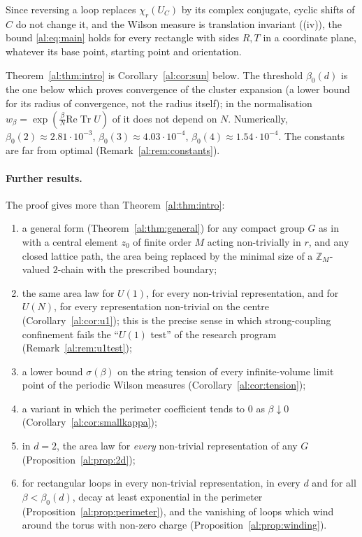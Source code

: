 \documentclass[11pt,a4paper]{article}
\theoremstyle{definition}
\theoremstyle{remark}
\DeclareMathOperator{\Tr}{Tr}
\newcommand{\Z}{\mathbb{Z}}
\newcommand{\Fref}[3]{\cite[#1~`#2' (\texttt{#3})]{F}}
\begin{document}
Since reversing a loop replaces $\chi_r(U_C)$ by its complex conjugate, cyclic shifts of $C$ do not change it, and the Wilson
measure is translation invariant (\Fref{Theorem}{Basic properties}{thm:basic}(iv)), the bound \eqref{al:eq:main} holds for
every rectangle with sides $R,T$ in a coordinate plane, whatever its base point, starting point and orientation.

Theorem~\ref{al:thm:intro} is Corollary~\ref{al:cor:sun} below. The threshold $\beta_0(d)$ is the one below which
\Fref{Theorem}{Convergence of the strong-coupling cluster expansion}{thm:conv} proves convergence of the cluster expansion
(a lower bound for its radius of convergence, not the radius itself); in
the normalisation $w_\beta=\exp(\frac\beta N\mathrm{Re}\Tr U)$ of \cite{F} it does not depend on $N$. Numerically,
$\beta_0(2)\approx2.81\cdot10^{-3}$, $\beta_0(3)\approx4.03\cdot10^{-4}$, $\beta_0(4)\approx1.54\cdot10^{-4}$. The
constants are far from optimal (Remark~\ref{al:rem:constants}).

\paragraph{Further results.} The proof gives more than Theorem~\ref{al:thm:intro}:
\begin{enumerate}[label=(\roman*)]
\item a general form (Theorem~\ref{al:thm:general}) for any compact group $G$ as in \cite{F} with a central element
$z_0$ of finite order $M$ acting non-trivially in $r$, and any closed lattice path, the area being replaced by the
minimal size of a $\Z_M$-valued $2$-chain with the prescribed boundary;
\item the same area law for $U(1)$, for every non-trivial representation, and for $U(N)$, for every representation
non-trivial on the centre (Corollary~\ref{al:cor:u1}); this is the precise sense in which strong-coupling confinement fails the
``$U(1)$ test'' of the research program (Remark~\ref{al:rem:u1test});
\item a lower bound $\sigma(\beta)$ on the string tension of every infinite-volume limit point of the periodic Wilson
measures (Corollary~\ref{al:cor:tension});
\item a variant in which the perimeter coefficient tends to $0$ as $\beta\downarrow0$ (Corollary~\ref{al:cor:smallkappa});
\item in $d=2$, the area law for \emph{every} non-trivial representation of any $G$ (Proposition~\ref{al:prop:2d});
\item for rectangular loops in every non-trivial representation, in every $d$ and for all $\beta<\beta_0(d)$, decay at least
exponential in the perimeter (Proposition~\ref{al:prop:perimeter}), and the vanishing of loops which wind around the torus with non-zero charge
(Proposition~\ref{al:prop:winding}).
\end{enumerate}
\end{document}
